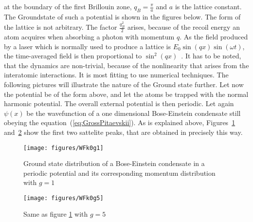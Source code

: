 at the boundary of the first Brillouin zone, $q_B=\frac{\pi}{a}$ and $a$ is the lattice constant. The Groundstate of such a potential is shown 
in the figures below. 
The form of the lattice is not arbitrary. The factor $\frac{q_B^2}{2}$ arises, because of the recoil energy an atom acquires when absorbing a 
photon with momentum $q$. As the field produced by a laser which is normally used to produce a lattice is $E_0\sin(qx)\sin(\omega t)$, the time-averaged 
field is then proportional to $\sin^2(qx)$~\cite{pitaevskii}.
It has to be noted, that the dynamics are non-trivial, because of the nonlinearity that arises from the interatomic interactions. It is most fitting to 
use numerical techniques. The following pictures will illustrate the nature of the Ground state further. 
Let now the potential be of the form above, and let the atoms be trapped with the normal harmonic potential. The overall external potential is then periodic. 
Let again $\psi(x)$ be the wavefunction of a one dimensional Bose-Einstein condensate still obeying the equation~(\ref{eq:GrossPitaevskii}). As is explained above, Figures~\ref{fig:WFk0g1} and~\ref{fig:WFk0g5} show the first two sattelite peaks, that 
are obtained in precisely this way.
\begin{figure}[H]
\begin{center}
\texttt{[image: figures/WFk0g1]}
\caption{Ground state distribution of a Bose-Einstein condensate in a periodic potential and its corresponding momentum distribution with
		$g=1$}
\label{fig:WFk0g1}
\end{center}
\end{figure}


\begin{figure}[H]
\begin{center}
\texttt{[image: figures/WFk0g5]}
\caption{Same as figure \ref{fig:WFk0g1} with $g=5$}
\label{fig:WFk0g5}
\end{center}
\end{figure}



		
